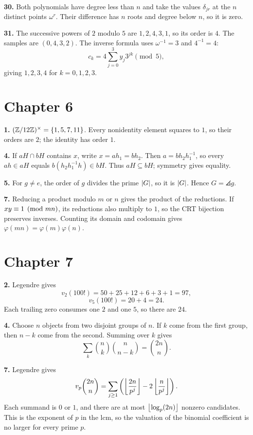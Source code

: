 \textbf{30.} Both polynomials have degree less than $n$ and take
the values $\delta_{jr}$ at the $n$ distinct points $\omega^r$.
Their difference has $n$ roots and degree below $n$, so it is zero.

\textbf{31.} The successive powers of $2$ modulo $5$ are $1,2,4,3,1$,
so its order is $4$. The samples are $(0,4,3,2)$.
The inverse formula uses $\omega^{-1}=3$ and $4^{-1}=4$:
\[
 c_k=4\sum_{j=0}^3 y_j3^{jk}\pmod5,
\]
giving $1,2,3,4$ for $k=0,1,2,3$.

\section*{Chapter 6}

\textbf{1.} $(\mathbb Z/12\mathbb Z)^\times=\{1,5,7,11\}$. Every nonidentity element squares to $1$, so their orders are $2$; the identity has order $1$.

\textbf{4.} If $aH\cap bH$ contains $x$, write $x=ah_1=bh_2$. Then $a=b h_2h_1^{-1}$, so every $ah\in aH$ equals $b(h_2h_1^{-1}h)\in bH$. Thus $aH\subseteq bH$; symmetry gives equality.

\textbf{5.} For $g\ne e$, the order of $g$ divides the prime $\left|G\right|$, so it is $\left|G\right|$. Hence $G=\angles g$.

\textbf{7.} Reducing a product modulo $m$ or $n$ gives the product
of the reductions. If $xy\equiv1\pmod{mn}$, its reductions also
multiply to $1$, so the CRT bijection preserves inverses. Counting
its domain and codomain gives $\varphi(mn)=\varphi(m)\varphi(n)$.

\section*{Chapter 7}

\textbf{2.} Legendre gives
\[
v_2(100!)=50+25+12+6+3+1=97,
\]
\[
v_5(100!)=20+4=24.
\]
Each trailing zero consumes one $2$ and one $5$, so there are $24$.

\textbf{4.} Choose $n$ objects from two disjoint groups of $n$. If $k$ come from the first group, then $n-k$ come from the second. Summing over $k$ gives
\[
\sum_k\binom nk\binom n{n-k}=\binom{2n}{n}.
\]

\textbf{7.} Legendre gives
\[
v_p\binom{2n}{n}=\sum_{j\ge1}\left(\left\lfloor \frac{2n}{p^j}\right\rfloor-2\left\lfloor \frac n{p^j}\right\rfloor\right).
\]
Each summand is $0$ or $1$, and there are at most $\left\lfloor \log_p(2n)\right\rfloor$ nonzero candidates. This is the exponent of $p$ in the lcm, so the valuation of the binomial coefficient is no larger for every prime $p$.

